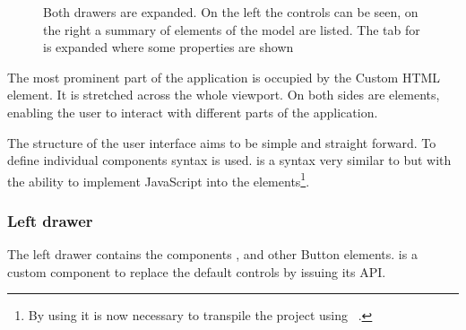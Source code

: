 \begin{figure}
    \centering
    \caption[Screenshot of the web application]{ Both drawers are expanded. On the left the  controls can be seen, on the right a summary of elements of the model are listed. The tab for  is expanded where some properties are shown }\label{fig:deepmech_klawr_de}
\end{figure}

The most prominent part of the application is occupied by the  Custom HTML element.
It is stretched across the whole viewport.
On both sides are   elements, enabling the user to interact with different parts of the application.

The structure of the user interface aims to be simple and straight forward.
To define individual components   syntax is used.
 is a syntax very similar to  but with the ability to implement JavaScript into the elements\footnote{By using  it is now necessary to transpile the project using ~\cite{Babel2021}.}.

\subsubsection{Left drawer}

The left drawer contains the components ,  and other Button elements.
 is a custom  component to replace the default  controls by issuing its API.\@


